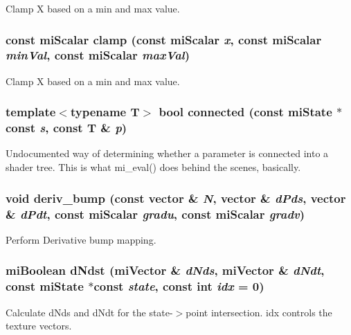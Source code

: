 Clamp X based on a min and max value. 

\subsubsection{\setlength{\rightskip}{0pt plus 5cm}const mi\-Scalar clamp (const mi\-Scalar {\em x}, const mi\-Scalar {\em min\-Val}, const mi\-Scalar {\em max\-Val})\hspace{0.3cm}{\tt  [inline]}}\label{namespacemr_a63}


Clamp X based on a min and max value. 

\subsubsection{\setlength{\rightskip}{0pt plus 5cm}template$<$typename T$>$ bool connected (const mi\-State $\ast$const {\em s}, const T \& {\em p})\hspace{0.3cm}{\tt  [inline]}}\label{namespacemr_a68}


Undocumented way of determining whether a parameter is connected into a shader tree. This is what mi\_\-eval() does behind the scenes, basically. 
\subsubsection{\setlength{\rightskip}{0pt plus 5cm}void deriv\_\-bump (const vector \& {\em N}, vector \& {\em d\-Pds}, vector \& {\em d\-Pdt}, const mi\-Scalar {\em gradu}, const mi\-Scalar {\em gradv})\hspace{0.3cm}{\tt  [inline]}}\label{namespacemr_a18}


Perform Derivative bump mapping. 

\subsubsection{\setlength{\rightskip}{0pt plus 5cm}mi\-Boolean d\-Ndst (mi\-Vector \& {\em d\-Nds}, mi\-Vector \& {\em d\-Ndt}, const mi\-State $\ast$const {\em state}, const int {\em idx} = 0)\hspace{0.3cm}{\tt  [static]}}\label{namespacemr_a48}


Calculate d\-Nds and d\-Ndt for the state-$>$point intersection. idx controls the texture vectors. 
